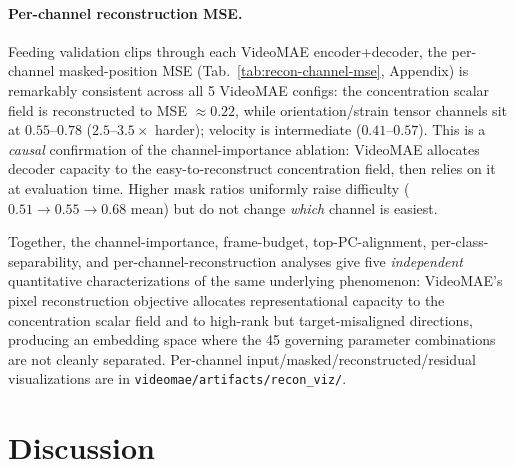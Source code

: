 \documentclass{article}
\begin{document}
\paragraph{Per-channel reconstruction MSE.} Feeding validation clips through
each VideoMAE encoder+decoder, the per-channel masked-position MSE
(Tab.~\ref{tab:recon-channel-mse}, Appendix) is remarkably consistent across
all 5 VideoMAE configs: the concentration scalar field is reconstructed to
MSE $\approx 0.22$, while orientation/strain tensor channels sit at
$0.55$--$0.78$ ($2.5$--$3.5{\times}$ harder); velocity is intermediate
($0.41$--$0.57$). This is a \emph{causal} confirmation of the
channel-importance ablation: VideoMAE allocates decoder capacity to the
easy-to-reconstruct concentration field, then relies on it at evaluation
time. Higher mask ratios uniformly raise difficulty
($0.51 \to 0.55 \to 0.68$ mean) but do not change \emph{which} channel is
easiest.

Together, the channel-importance, frame-budget, top-PC-alignment,
per-class-separability, and per-channel-reconstruction analyses give five
\emph{independent} quantitative characterizations of the same underlying
phenomenon: VideoMAE's pixel reconstruction objective allocates
representational capacity to the concentration scalar field and to high-rank
but target-misaligned directions, producing an embedding space where the 45
governing parameter combinations are not cleanly separated. Per-channel
input/masked/reconstructed/residual visualizations are in
\texttt{videomae/artifacts/recon\_viz/}.

\section{Discussion}
\label{sec:discussion}
\end{document}
